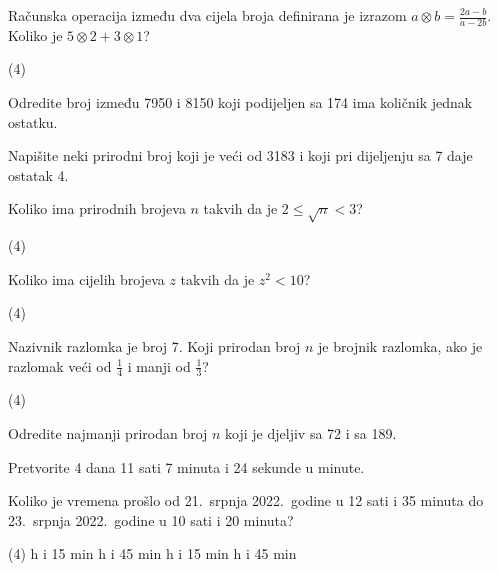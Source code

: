 \begin{zadatak}
	Računska operacija između dva cijela broja definirana je izrazom $\displaystyle a \otimes b = \frac{2a-b}{a-2b}$.
	Koliko je $5 \otimes 2 + 3 \otimes 1$?
    \begin{tasks}(4)
	\end{tasks}
\end{zadatak}

\begin{zadatak}
	Odredite broj između 7950 i 8150 koji podijeljen sa 174 ima količnik jednak ostatku.
\end{zadatak}

\begin{zadatak}
	Napišite neki prirodni broj koji je veći od 3183 i koji pri dijeljenju sa 7 daje ostatak 4.
\end{zadatak}

\begin{zadatak}
	Koliko ima prirodnih brojeva $n$ takvih da je $2 \leq \sqrt{n} < 3$?
    \begin{tasks}(4)
	\end{tasks}
\end{zadatak}

\begin{zadatak}
	Koliko ima cijelih brojeva $z$ takvih da je $z^2 < 10$?
    \begin{tasks}(4)
	\end{tasks}
\end{zadatak}

\begin{zadatak}
	Nazivnik razlomka je broj 7.
	Koji prirodan broj $n$ je brojnik razlomka, ako je razlomak veći od $\displaystyle \frac{1}{4}$ i manji od $\displaystyle \frac{1}{3}$?
    \begin{tasks}(4)
	\end{tasks}
\end{zadatak}

\begin{zadatak}
	Odredite najmanji prirodan broj $n$ koji je djeljiv sa 72 i sa 189.
\end{zadatak}

\begin{zadatak}
	Pretvorite 4 dana 11 sati 7 minuta i 24 sekunde u minute.
\end{zadatak}

\begin{zadatak}
	Koliko je vremena prošlo od 21.\ srpnja 2022.\ godine u 12 sati i 35 minuta do 23.\ srpnja 2022.\ godine u 10 sati i 20 minuta?
    \begin{tasks}(4)
		 h i 15 min
		 h i 45 min
		 h i 15 min
		 h i 45 min
	\end{tasks}
\end{zadatak}

